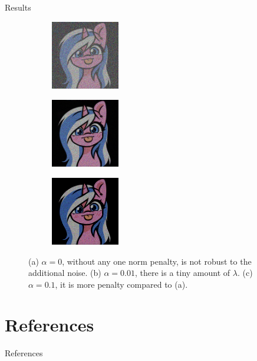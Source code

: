 \documentclass[11pt]{beamer}
\begin{document}
        \begin{frame}{Results}
            \begin{figure}[H]
                \centering
                \begin{subfigure}{3.5cm}
                    \includegraphics[width=3cm]{inverse_linear_experiment1-soln_img.jpg}
                    \caption{} \label{fig:1a}
                \end{subfigure}     %
                \begin{subfigure}{3.5cm}
                    \includegraphics[width=3cm]{inverse_linear_experiment2-soln_img.jpg}
                    \caption{} \label{fig:1b}
                \end{subfigure}     %
                \begin{subfigure}{3.5cm}
                    \includegraphics[width=3cm]{inverse_linear_experiment3-soln_img.jpg}
                    \caption{} \label{fig:1c}
                \end{subfigure}
                \caption{(a) $\alpha = 0$, without any one norm penalty, is not robust to the additional noise. (b) $\alpha = 0.01$, there is a tiny amount of $\lambda$. (c) $\alpha = 0.1$, it is more penalty compared to (a).}
                \label{fig:alto_deblurred}
            \end{figure}
        \end{frame}

    


\section{References}
    \begin{frame}{References}
        
    \end{frame}
\end{document}
